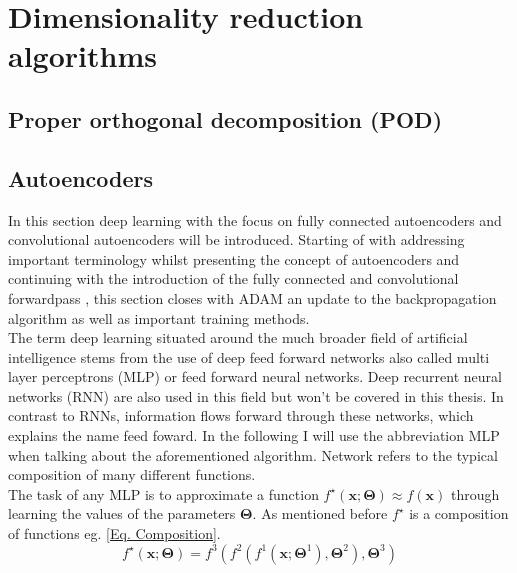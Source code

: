 
\chapter{Dimensionality reduction algorithms}
\label{Ch:DimRedAl}


\section{Proper orthogonal decomposition (POD)}
\section{Autoencoders}
In this section deep learning with the focus on fully connected autoencoders and convolutional autoencoders will be introduced. Starting of with addressing important terminology whilst presenting the concept of autoencoders and continuing with the introduction of the fully connected and convolutional forwardpass , this section closes with ADAM \cite{the} an update to the backpropagation algorithm as well as important training methods.\\ 
The term deep learning situated around the much broader field of artificial intelligence stems from the use of deep feed forward networks also called multi layer perceptrons (MLP) or feed forward neural networks. Deep recurrent neural networks (RNN) are also used in this field but won't be covered in this thesis. In contrast to RNNs, information flows forward through these networks, which explains the name feed foward. In the following I will use the abbreviation MLP when talking about the aforementioned algorithm. Network refers to the typical composition of many different functions.\\The task of any MLP is to approximate a function \(f^\star(\mathbf{x};\mathbf{\Theta}) \approx f(\mathbf{x})\) through learning the values of the parameters \(\mathbf{\Theta}\). As mentioned before  \(f^\star\) is a composition of functions eg. \cref{Eq. Composition}.
\begin{equation}
	 f^\star(\mathbf{x};\mathbf{\Theta})= f^3(f^2(f^1(\mathbf{x};\mathbf{\Theta}^1),\mathbf{\Theta}^2),\mathbf{\Theta}^3)
	 \label{Eq. Composition}
\end{equation}
